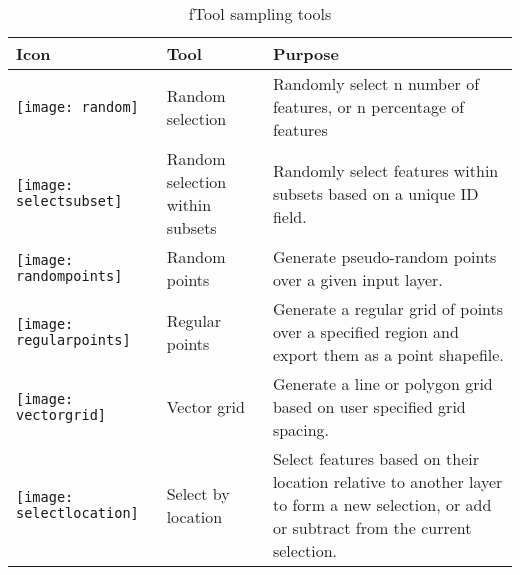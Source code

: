 \begin{table}[ht]
\centering
\caption{fTool sampling tools}\label{tab:ftool_sampling}\medskip
 \begin{tabular}{|p{0.3in}|p{1.3in}|p{4.6in}|}
 \hline \textbf{Icon} & \textbf{Tool} & \textbf{Purpose} \\
 \hline \texttt{[image: random]} & Random selection & Randomly select n number of features, or n percentage of features \\
 \hline \texttt{[image: selectsubset]} & Random selection within subsets & Randomly select features within subsets based on a unique ID field. \\
 \hline \texttt{[image: randompoints]} & Random points & Generate pseudo-random points over a given input layer. \\
 \hline \texttt{[image: regularpoints]} & Regular points & Generate a regular grid of points over a specified region and export them as a point shapefile. \\
 \hline \texttt{[image: vectorgrid]} & Vector grid & Generate a line or polygon grid based on user specified grid spacing. \\
 \hline \texttt{[image: selectlocation]} & Select by location & Select features based on their location relative to another layer to form a new selection, or add or subtract from the current selection. \\
 \hline
\end{tabular}
\end{table}


